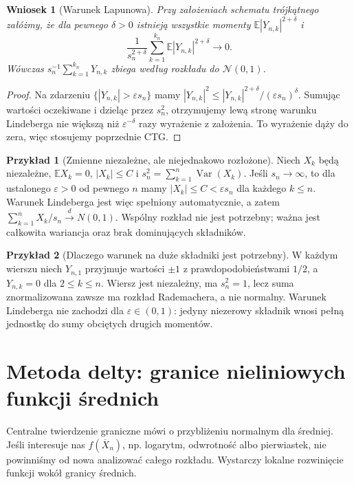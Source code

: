 \documentclass[11pt,a4paper,oneside]{report}
\numberwithin{equation}{chapter}
\theoremstyle{plain}
\newtheorem{wniosek}[twierdzenie]{Wniosek}
\theoremstyle{definition}
\newtheorem{przyklad}{Przykład}[chapter]
\theoremstyle{remark}
\newcommand{\E}{\mathbb{E}}
\newcommand{\Var}{\operatorname{Var}}
\newcommand{\Normal}{\mathcal{N}}
\begin{document}
\begin{wniosek}[Warunek Lapunowa]
Przy założeniach schematu trójkątnego załóżmy,
że dla pewnego $\delta>0$ istnieją wszystkie momenty
$\E|Y_{n,k}|^{2+\delta}$ i
\[
\frac{1}{s_n^{2+\delta}}
\sum_{k=1}^{k_n}\E|Y_{n,k}|^{2+\delta}
\longrightarrow0.
\]
Wówczas $s_n^{-1}\sum_{k=1}^{k_n}Y_{n,k}$
zbiega według rozkładu do $\Normal(0,1)$.
\end{wniosek}
\begin{proof}
Na zdarzeniu $\{|Y_{n,k}|>\varepsilon s_n\}$
mamy $|Y_{n,k}|^2\leq
|Y_{n,k}|^{2+\delta}/(\varepsilon s_n)^\delta$.
Sumując wartości oczekiwane i dzieląc przez $s_n^2$,
otrzymujemy lewą stronę warunku Lindeberga
nie większą niż $\varepsilon^{-\delta}$ razy
wyrażenie z założenia. To wyrażenie dąży do zera,
więc stosujemy poprzednie CTG.
\end{proof}

\begin{przyklad}[Zmienne niezależne, ale niejednakowo rozłożone]
Niech $X_k$ będą niezależne, $\E X_k=0$,
$|X_k|\leq C$ i
$s_n^2=\sum_{k=1}^n\Var(X_k)$.
Jeśli $s_n\to\infty$, to dla ustalonego
$\varepsilon>0$ od pewnego $n$ mamy
$|X_k|\leq C<\varepsilon s_n$ dla każdego
$k\leq n$. Warunek Lindeberga jest więc
spełniony automatycznie, a zatem
$\sum_{k=1}^nX_k/s_n\xrightarrow d N(0,1)$.
Wspólny rozkład nie jest potrzebny; ważna jest
całkowita wariancja oraz brak dominujących składników.
\end{przyklad}

\begin{przyklad}[Dlaczego warunek na duże składniki jest potrzebny]
W każdym wierszu niech $Y_{n,1}$ przyjmuje
wartości $\pm1$ z prawdopodobieństwami $1/2$,
a $Y_{n,k}=0$ dla $2\leq k\leq n$.
Wiersz jest niezależny, ma $s_n^2=1$,
lecz suma znormalizowana zawsze ma rozkład
Rademachera, a nie normalny.
Warunek Lindeberga nie zachodzi dla
$\varepsilon\in(0,1)$: jedyny niezerowy składnik
wnosi pełną jednostkę do sumy obciętych drugich
momentów.
\end{przyklad}

\section{Metoda delty: granice nieliniowych funkcji średnich}

Centralne twierdzenie graniczne mówi o przybliżeniu
normalnym dla średniej. Jeśli interesuje nas
$f(\overline X_n)$, np. logarytm, odwrotność albo
pierwiastek, nie powinniśmy od nowa analizować
całego rozkładu. Wystarczy lokalne rozwinięcie
funkcji wokół granicy średnich.
\end{document}
